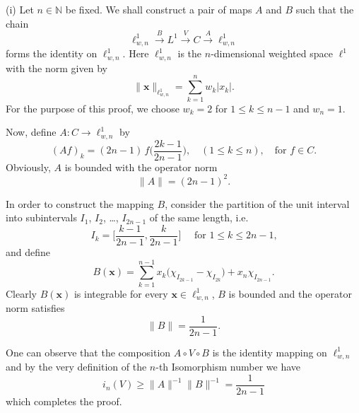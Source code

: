 \documentclass[10pt,reqno]{amsart}
\def\N{\mathbb{N}}
\numberwithin{equation}{section}
\let\oldendproof\endproof
\renewenvironment{proof}[1][\proofname]{%
  \oldproof[\bf #1]%
}{\oldendproof}
\def\Li{{L^1}}
\def\li{{\ell^1}}
\def\Linf{{C}}
\def\vx{\mathbf{x}}
\begin{document}
\begin{proof}
(i)
Let $n\in\N$ be fixed.
We shall construct a pair of maps $A$ and $B$ such that the chain
\def\lio{\ell^{1}_{w,n}}
\begin{equation*} %
	\lio
		\xrightarrow{B} \Li
		\xrightarrow{V} \Linf
		\xrightarrow{A} \lio
\end{equation*}
forms the identity on $\lio$. Here $\lio$ is the $n$-dimensional weighted space $\li$ with the norm given by
\begin{equation*}
	\|\vx\|_{\lio} = \sum_{k=1}^n w_k |x_k|.
\end{equation*}
For the purpose of this proof, we choose $w_k = 2$ for $1\le k \le n-1$ and $w_n=1$.

Now, define $A\colon\Linf\to \lio$ by
\begin{equation*}
	(Af)_k = (2n-1)\, f \biggl(\frac{2k-1}{2n-1}\biggr),
		\quad (1\le k\le n),
		\quad\text{for $f\in\Linf$}.
\end{equation*}
Obviously, $A$ is bounded with the operator norm
\begin{equation*}
	\|A\| = (2n-1)^2.
\end{equation*}

In order to construct the mapping $B$, consider the partition of the unit interval into subintervals $I_1$, $I_2$, \ldots, $I_{2n-1}$ of the same length, i.e.
\begin{equation*}
	I_k = \biggl[ \frac{k-1}{2n-1}, \frac{k}{2n-1} \biggr]
		\quad\text{ for $1\le k \le 2n-1$,}
\end{equation*}
and define
\begin{equation*}
	B(\vx) = \sum_{k=1}^{n-1} x_k \bigl( \chi_{I_{2k-1}} - \chi_{I_{2k}} \bigr)
		+ x_n \chi_{I_{2n-1}}.
\end{equation*}
Clearly $B(\vx)$ is integrable for every $\vx\in\lio$, $B$ is bounded and the operator norm
satisfies
\begin{equation*}
	\|B\| = \frac{1}{2n-1}.
\end{equation*}

One can observe that the composition $A\circ V\circ B$ is the identity mapping on $\lio$
and by the very definition of the $n$-th Isomorphism number we have
\begin{equation*}
	i_n(V) \ge \| A \|^{-1} \| B \|^{-1} = \frac{1}{2n-1}
\end{equation*}
which completes the proof.



\end{proof}
\end{document}
